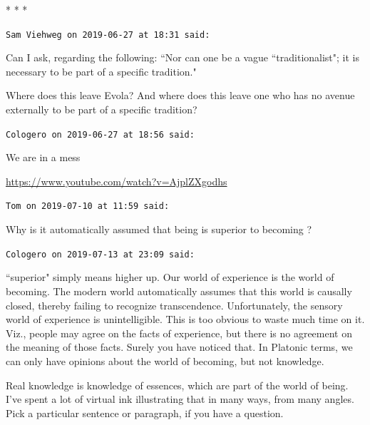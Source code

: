 
\begin{center}* * *\end{center}

\begin{footnotesize}\begin{sffamily}



\texttt{Sam Viehweg on 2019-06-27 at 18:31 said: }

Can I ask, regarding the following: ``Nor can one be a vague ``traditionalist"; it is necessary to be part of a specific tradition."

Where does this leave Evola? And where does this leave one who has no avenue externally to be part of a specific tradition?


\hfill

\texttt{Cologero on 2019-06-27 at 18:56 said: }

We are in a mess

\url{https://www.youtube.com/watch?v=AjplZXgodhs}


\hfill

\texttt{Tom on 2019-07-10 at 11:59 said: }

Why is it automatically assumed that being is superior to becoming ?


\hfill

\texttt{Cologero on 2019-07-13 at 23:09 said: }

``superior" simply means higher up. Our world of experience is the world of becoming. The modern world automatically assumes that this world is causally closed, thereby failing to recognize transcendence. Unfortunately, the sensory world of experience is unintelligible. This is too obvious to waste much time on it. Viz., people may agree on the facts of experience, but there is no agreement on the meaning of those facts. Surely you have noticed that. In Platonic terms, we can only have opinions about the world of becoming, but not knowledge.

Real knowledge is knowledge of essences, which are part of the world of being. I've spent a lot of virtual ink illustrating that in many ways, from many angles. Pick a particular sentence or paragraph, if you have a question.


\end{sffamily}\end{footnotesize}
